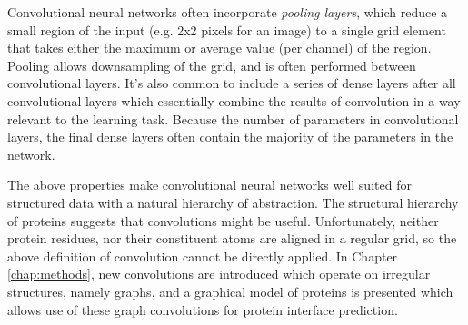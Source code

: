 Convolutional neural networks often incorporate \textit{pooling layers}, which reduce a small region of the input (e.g. 2x2 pixels for an image) to a single grid element that takes either the maximum or average value (per channel) of the region. 
Pooling allows downsampling of the grid, and is often performed between convolutional layers. 
It's also common to include a series of dense layers after all convolutional layers which essentially combine the results of convolution in a way relevant to the learning task.
Because the number of parameters in convolutional layers, the final dense layers often contain the majority of the parameters in the network.


 The above properties make convolutional neural networks well suited for structured data with a natural hierarchy of abstraction.
 The structural hierarchy of proteins suggests that convolutions might be useful.
 Unfortunately, neither protein residues, nor their constituent atoms are aligned in a regular grid, so the above definition of convolution cannot be directly applied. 
 In Chapter \ref{chap:methods}, new convolutions are introduced which operate on irregular structures, namely graphs, and a graphical model of proteins is presented which allows use of these graph convolutions for protein interface prediction.